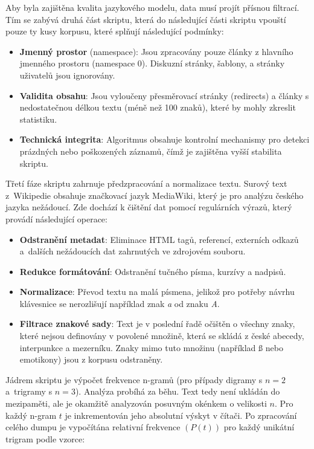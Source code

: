 \documentclass[a4paper, twoside, 12pt, czech]{article}
\begin{document}
Aby byla zajištěna kvalita jazykového modelu, data musí projít přísnou filtrací. 
Tím se zabývá druhá část skriptu, která do následující části skriptu vpouští 
pouze ty kusy korpusu, které splňují následující podmínky: 
\begin{itemize}
    \item \textbf{Jmenný prostor} (namespace): Jsou zpracovány pouze články z 
    hlavního jmenného prostoru (namespace 0). Diskuzní stránky, šablony, a stránky 
    uži\-vatelů jsou ignorovány.
    \item \textbf{Validita obsahu}: Jsou vyloučeny přesměrovací stránky 
    (redirects) a články s nedostatečnou délkou textu (méně než 100 znaků), 
    které by mohly zkreslit statistiku.
    \item \textbf{Technická integrita}: Algoritmus obsahuje kontrolní mechanismy 
    pro detekci prázdných nebo poškozených záznamů, čímž je zajištěna vyšší stabilita 
    skriptu.
\end{itemize}

Třetí fáze skriptu zahrnuje předzpracování a normalizace textu. Surový text z~Wikipedie 
obsahuje značkovací jazyk MediaWiki, který je pro analýzu českého 
jazyka nežádoucí. Zde dochází k čištění dat pomocí regulárních výrazů, který 
provádí následující operace:
\begin{itemize}
    \item \textbf{Odstranění metadat}: Eliminace HTML tagů, referencí, externích 
    odkazů a~dalších nežádoucích dat zahrnutých ve zdrojovém souboru.
    \item \textbf{Redukce formátování}: Odstranění tučného písma, kurzívy a nadpisů.
    \item \textbf{Normalizace}: Převod textu na malá písmena, jelikož pro potřeby 
    návrhu klávesnice se nerozlišují například znak \textit{a} od znaku \textit{A}.
    \item \textbf{Filtrace znakové sady}: Text je v poslední řadě očištěn o všechny 
    znaky, které nejsou definovány v povolené množině, která se skládá z české 
    abecedy, interpunkce a mezerníku. Znaky mimo tuto množinu (například ß nebo 
    emotikony) jsou z korpusu odstraněny.
\end{itemize}

Jádrem skriptu je výpočet frekvence n-gramů (pro případy digramy s $n=2$ a~trigramy 
s $n=3$). Analýza probíhá za běhu. Text tedy není ukládán do mezipaměti, 
ale je okamžitě analyzován posuvným okénkem o velikosti $n$. Pro každý n-gram $t$ 
je inkrementován jeho absolutní výskyt v čítači. Po zpracování celého dumpu je 
vypočítána relativní frekvence $(P(t))$ pro každý unikátní trigram podle vzorce: 
\end{document}
